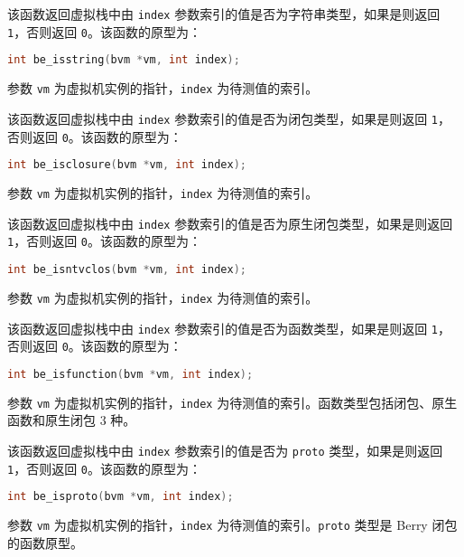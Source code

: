 
该函数返回虚拟栈中由 \texttt{index} 参数索引的值是否为字符串类型，如果是则返回 \texttt{1}，否则返回 \texttt{0}。该函数的原型为：
\begin{lstlisting}[language=c, style=berry, numbers=none]
int be_isstring(bvm *vm, int index);
\end{lstlisting}
参数 \texttt{vm} 为虚拟机实例的指针，\texttt{index} 为待测值的索引。


该函数返回虚拟栈中由 \texttt{index} 参数索引的值是否为闭包类型，如果是则返回 \texttt{1}，否则返回 \texttt{0}。该函数的原型为：
\begin{lstlisting}[language=c, style=berry, numbers=none]
int be_isclosure(bvm *vm, int index);
\end{lstlisting}
参数 \texttt{vm} 为虚拟机实例的指针，\texttt{index} 为待测值的索引。


该函数返回虚拟栈中由 \texttt{index} 参数索引的值是否为原生闭包类型，如果是则返回 \texttt{1}，否则返回 \texttt{0}。该函数的原型为：
\begin{lstlisting}[language=c, style=berry, numbers=none]
int be_isntvclos(bvm *vm, int index);
\end{lstlisting}
参数 \texttt{vm} 为虚拟机实例的指针，\texttt{index} 为待测值的索引。


该函数返回虚拟栈中由 \texttt{index} 参数索引的值是否为函数类型，如果是则返回 \texttt{1}，否则返回 \texttt{0}。该函数的原型为：
\begin{lstlisting}[language=c, style=berry, numbers=none]
int be_isfunction(bvm *vm, int index);
\end{lstlisting}
参数 \texttt{vm} 为虚拟机实例的指针，\texttt{index} 为待测值的索引。函数类型包括闭包、原生函数和原生闭包 3 种。


该函数返回虚拟栈中由 \texttt{index} 参数索引的值是否为 \texttt{proto} 类型，如果是则返回 \texttt{1}，否则返回 \texttt{0}。该函数的原型为：
\begin{lstlisting}[language=c, style=berry, numbers=none]
int be_isproto(bvm *vm, int index);
\end{lstlisting}
参数 \texttt{vm} 为虚拟机实例的指针，\texttt{index} 为待测值的索引。\texttt{proto} 类型是 Berry 闭包的函数原型。


